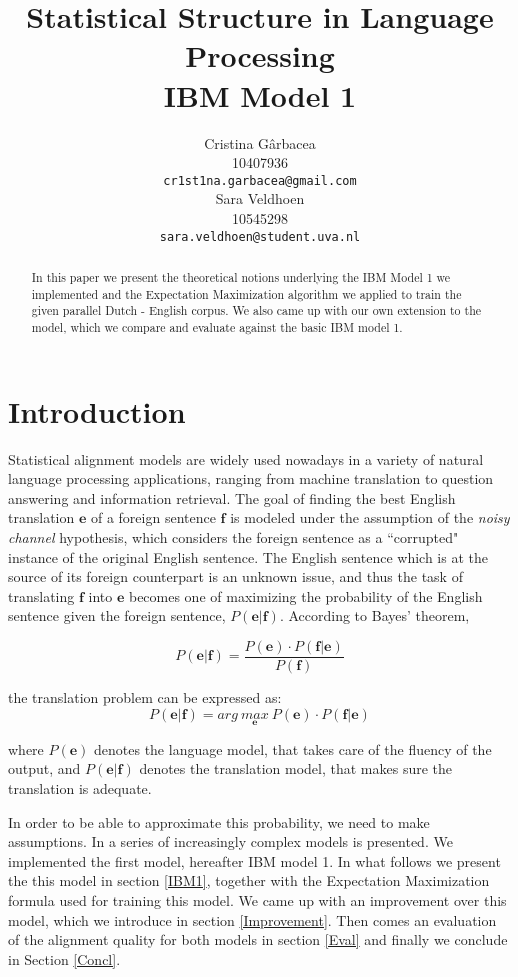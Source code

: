 \documentclass[11pt]{article}
\title{Statistical Structure in Language Processing \\ IBM Model 1}
\author{ Cristina G\^arbacea\\
  10407936 \\
  {\small \tt cr1st1na.garbacea@gmail.com} 
  \\\And
  Sara Veldhoen \\
10545298   \\
  {\small \tt sara.veldhoen@student.uva.nl} \\}
\date{}
\renewcommand{\vec}[1]{\mathbf{#1}}
\begin{document}
\maketitle

\begin{abstract}
In this paper we present the theoretical notions underlying the IBM Model 1 we implemented and the Expectation Maximization algorithm we applied to train the given parallel Dutch - English corpus. 
We also came up with our own extension to the model, which we compare and evaluate against the basic IBM model 1. 
\end{abstract}

\section{Introduction}
Statistical alignment models are widely used nowadays in a variety of natural language processing applications, ranging from machine translation to question answering and information retrieval. The goal of finding the best English translation $\vec{e}$ of a foreign sentence $\vec{f}$ is modeled under the assumption of the \textit{noisy channel} hypothesis, which considers the foreign sentence as a ``corrupted" instance of the original English sentence. The English sentence which is at the source of its foreign counterpart is an unknown issue, and thus the task of translating $\vec{f}$ into $\vec{e}$ becomes one of maximizing the probability of the English sentence given the foreign sentence, $P(\vec{e}|\vec{f})$. According to Bayes' theorem, 

\begin{equation}
P(\vec{e}|\vec{f})= \frac{P(\vec{e})\cdot P(\vec{f}|\vec{e})}{P(\vec{f})}
\end{equation}

the translation problem can be expressed as:
\begin{equation}
P(\vec{e}|\vec{f})= arg \ \underset{\vec{e}}{max} \ P(\vec{e})\cdot P(\vec{f}|\vec{e})
\end{equation}

where $P(\vec{e})$ denotes the language model, that takes care of the fluency of the output, 
 and $P(\vec{e}|\vec{f})$ denotes the translation model, that makes sure the translation is adequate. 

In order to be able to approximate this probability, we need to make assumptions. In %
a series of increasingly complex models is presented. We implemented the first model, hereafter IBM model 1. 
In what follows we present the this model in section \ref{IBM1}, together with the Expectation Maximization formula used for training this model. We came up with an improvement over this model, which we introduce in section \ref{Improvement}. Then comes an evaluation of the alignment quality for both models in section \ref{Eval} and finally we conclude in Section \ref{Concl}.
\end{document}
